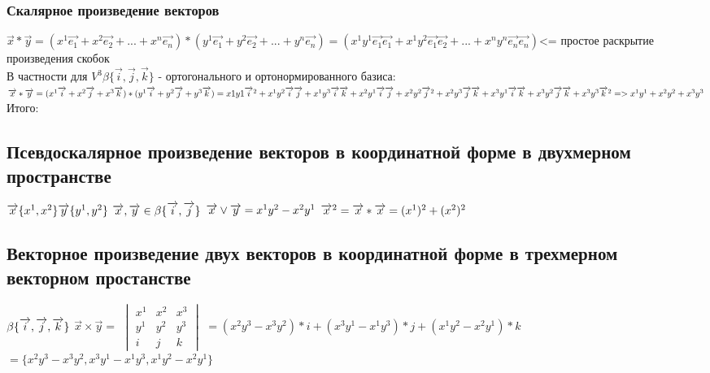 \documentclass{article}
\begin{document}
\subsubsection{Скалярное произведение векторов}
$\overrightarrow{x}*\overrightarrow{y}=(x^1\overrightarrow{e_1}+x^2\overrightarrow{e_2}+...+x^n\overrightarrow{e_n})*(y^1\overrightarrow{e_1}+y^2\overrightarrow{e_2}+...+y^n\overrightarrow{e_n})=(x^1y^1\overrightarrow{e_1}\overrightarrow{e_1}+x^1y^2\overrightarrow{e_1}\overrightarrow{e_2}+...+x^ny^n\overrightarrow{e_n}\overrightarrow{e_n})$<= простое раскрытие произведения скобок\\
В частности для $V^3 \beta\{\overrightarrow{i},\overrightarrow{j},\overrightarrow{k}\}$ - ортогонального и ортонормированного базиса:\\
$\overrightarrow{x}*\overrightarrow{y}=(x^1\overrightarrow{i}+x^2\overrightarrow{j}+x^3\overrightarrow{k})*(y^1\overrightarrow{i}+y^2\overrightarrow{j}+y^3\overrightarrow{k})=x1y1\overrightarrow{i}^2+x^1y^2\overrightarrow{i}\overrightarrow{j}+x^1y^3\overrightarrow{i}\overrightarrow{k}+x^2y^1\overrightarrow{i}\overrightarrow{j}+x^2y^2\overrightarrow{j}^2+x^2y^3\overrightarrow{j}\overrightarrow{k}+x^3y^1\overrightarrow{i}\overrightarrow{k}+x^3y^2\overrightarrow{j}\overrightarrow{k}+x^3y^3\overrightarrow{k}^2 => x^1y^1+x^2y^2+x^3y^3\\$
Итого:
\subsection{Псевдоскалярное произведение векторов в координатной форме в двухмерном пространстве}
$\overrightarrow{x}\{x^1,x^2\}  \overrightarrow{y}\{y^1,y^2\}\\$
$\overrightarrow{x}, \overrightarrow{y} \in \beta\{\overrightarrow{i},\overrightarrow{j}\}\\$
$\overrightarrow{x}\vee\overrightarrow{y}=x^1y^2-x^2y^1\\$
$\overrightarrow{x}^2=\overrightarrow{x}*\overrightarrow{x}=(x^1)^2+(x^2)^2\\$
\subsection{Векторное произведение двух векторов в координатной форме в трехмерном векторном простанстве}
$\beta\{\overrightarrow{i},\overrightarrow{j},\overrightarrow{k}\}\\$
$\overrightarrow{x}\times\overrightarrow{y}=$
$\begin{vmatrix}
    x^1 & x^2 & x^3\\
    y^1 & y^2 & y^3\\
    i & j & k
\end{vmatrix}$
$=(x^2y^3-x^3y^2)*i+(x^3y^1-x^1y^3)*j+(x^1y^2-x^2y^1)*k$
$=\{x^2y^3-x^3y^2,x^3y^1-x^1y^3,x^1y^2-x^2y^1\}$
\end{document}
